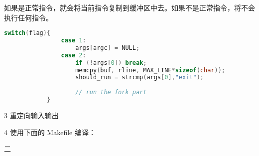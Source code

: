 \documentclass[12pt,a4paper]{article}
\newenvironment{problems}{\begin{list}{}{\renewcommand{\makelabel}[1]{\textbf{##1}\hfil}}}{\end{list}}
\newenvironment{steps}{\begin{list}{}{\renewcommand{\makelabel}[1]{##1.\hfil}}}{\end{list}}
\providecommand{\code}[2]{}
\begin{document}
\begin{problems}
\begin{steps}
        如果是正常指令，就会将当前指令复制到缓冲区中去。如果不是正常指令，将不会执行任何指令。
        \begin{lstlisting}[language=c]
            switch(flag){
                case 1:
                    args[argc] = NULL;
                case 2:
                    if (!args[0]) break;
                    memcpy(buf, rline, MAX_LINE*sizeof(char));
                    should_run = strcmp(args[0],"exit");
                    
                    // run the fork part
            }
        \end{lstlisting}

        \item[3] 重定向输入输出
        
        
        \item[4] 
        使用下面的 Makefile 编译：
        \code{src/Makefile}{}

    \end{steps} 
    \item[二]  

\end{problems}
\end{document}
